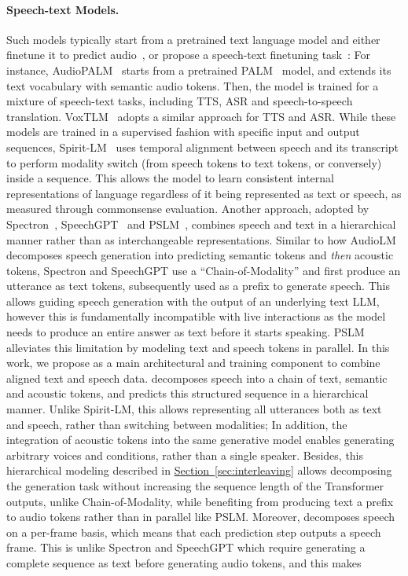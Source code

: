 \paragraph{Speech-text Models.}
Such models typically start from a pretrained text language model and either finetune it to predict audio~\citep{twist}, or propose a speech-text finetuning task~\citep{audiopalm,voxtlm,spectron,spiritlm,mitsui2024pslmparallelgenerationtext,zhang2024speechgpt}: For instance, AudioPALM~\citep{audiopalm} starts from a pretrained PALM~\citep{palm} model, and extends its text vocabulary with semantic audio tokens. Then, the model is trained for a mixture of speech-text tasks, including TTS, ASR and speech-to-speech translation. VoxTLM~\citep{voxtlm} adopts a similar approach for TTS and ASR. While these models are trained in a supervised fashion with specific input and output sequences, Spirit-LM~\citep{spiritlm} uses temporal alignment between speech and its transcript to perform modality switch (from speech tokens to text tokens, or conversely) inside a sequence. This allows the model to learn consistent internal representations of language regardless of it being represented as text or speech, as measured through commonsense evaluation. Another approach, adopted by Spectron~\citep{spectron}, SpeechGPT~\citep{speechgpt_emnlp} and PSLM~\citep{mitsui2024pslmparallelgenerationtext}, combines speech and text in a hierarchical manner rather than as interchangeable representations. Similar to how AudioLM~\citep{audiolm} decomposes speech generation into predicting semantic tokens and \textit{then} acoustic tokens, Spectron and SpeechGPT use a ``Chain-of-Modality'' and first produce an utterance as text tokens, subsequently used as a prefix to generate speech. This allows guiding speech generation with the output of an underlying text LLM, however this is fundamentally incompatible with live interactions as the model needs to produce an entire answer as text before it starts speaking. PSLM alleviates this limitation by modeling text and speech tokens in parallel. In this work, we propose \interleaving as a main architectural and training component to combine aligned text and speech data. \interleaving decomposes speech into a chain of text, semantic and acoustic tokens, and predicts this structured sequence in a hierarchical manner. Unlike Spirit-LM, this allows representing all utterances both as text and speech, rather than switching between modalities; In addition, the integration of acoustic tokens into the same generative model enables generating arbitrary voices and conditions, rather than a single speaker. Besides, this hierarchical modeling described in \hyperref[sec:interleaving]{Section~\ref{sec:interleaving}} allows decomposing the generation task without increasing the sequence length of the Transformer~\citep{attentionvaswani} outputs, unlike Chain-of-Modality, while benefiting from producing text a prefix to audio tokens rather than in parallel like PSLM. Moreover, \interleaving decomposes speech on a per-frame basis, which means that each prediction step outputs a speech frame. This is unlike Spectron and SpeechGPT which require generating a complete sequence as text before generating audio tokens, and this makes \ours{} 